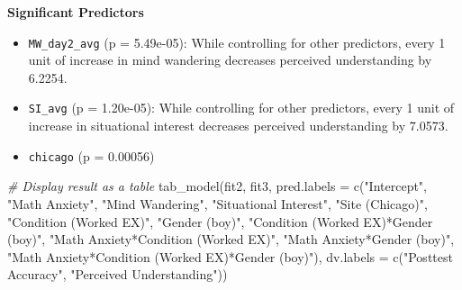 \documentclass[
  letterpaper,
  DIV=11,
  numbers=noendperiod]{scrartcl}
\newenvironment{Shaded}{\begin{snugshade}}{\end{snugshade}}
\newcommand{\AttributeTok}[1]{\textcolor[rgb]{0.49,0.56,0.16}{#1}}
\newcommand{\CommentTok}[1]{\textcolor[rgb]{0.38,0.63,0.69}{\textit{#1}}}
\newcommand{\FunctionTok}[1]{\textcolor[rgb]{0.02,0.16,0.49}{#1}}
\newcommand{\NormalTok}[1]{\textcolor[rgb]{0.00,0.44,0.13}{#1}}
\newcommand{\StringTok}[1]{\textcolor[rgb]{0.25,0.44,0.63}{#1}}
\begin{document}
\textbf{Significant Predictors}

\begin{itemize}
\item
  \texttt{MW\_day2\_avg} (p = 5.49e-05): While controlling for other
  predictors, every 1 unit of increase in mind wandering decreases
  perceived understanding by 6.2254.
\item
  \texttt{SI\_avg} (p = 1.20e-05): While controlling for other
  predictors, every 1 unit of increase in situational interest decreases
  perceived understanding by 7.0573.
\item
  \texttt{chicago} (p = 0.00056)
\end{itemize}

\begin{Shaded}
\begin{Highlighting}[]
\CommentTok{\# Display result as a table}
\FunctionTok{tab\_model}\NormalTok{(fit2, fit3,}
          \AttributeTok{pred.labels =} \FunctionTok{c}\NormalTok{(}\StringTok{"Intercept"}\NormalTok{, }\StringTok{"Math }
\StringTok{                          Anxiety"}\NormalTok{, }\StringTok{"Mind }
\StringTok{                          Wandering"}\NormalTok{, }
                          \StringTok{"Situational }
\StringTok{                          Interest"}\NormalTok{, }\StringTok{"Site (Chicago)"}\NormalTok{, }\StringTok{"Condition (Worked EX)"}\NormalTok{, }\StringTok{"Gender (boy)"}\NormalTok{, }\StringTok{"Condition (Worked EX)*Gender (boy)"}\NormalTok{, }\StringTok{"Math Anxiety*Condition (Worked EX)"}\NormalTok{, }\StringTok{"Math Anxiety*Gender (boy)"}\NormalTok{, }\StringTok{"Math Anxiety*Condition (Worked EX)*Gender (boy)"}\NormalTok{),}
  \AttributeTok{dv.labels =} \FunctionTok{c}\NormalTok{(}\StringTok{"Posttest Accuracy"}\NormalTok{, }\StringTok{"Perceived Understanding"}\NormalTok{))}
\end{Highlighting}
\end{Shaded}
\end{document}
